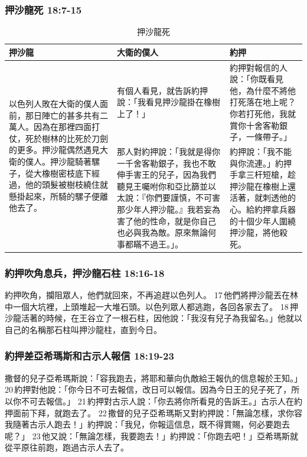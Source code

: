 \subsubsection{押沙龍死 18:7-15}
\begin{table}[H]
\hspace*{-12mm}
\centering 
\begin{tabular}{p{4.25cm}|p{6.74cm}|p{6.25cm}}\hline\hline
押沙龍&大衛的僕人&約押\\\hline
\multirow{2}{4.35cm}{以色列人敗在大衛的僕人面前，那日陣亡的甚多共有二萬人。因為在那裡四面打仗，死於樹林的比死於刀劍的更多。押沙龍偶然遇見大衛的僕人。押沙龍騎著騾子，從大橡樹密枝底下經過，他的頭髮被樹枝繞住就懸掛起來，所騎的騾子便離他去了。}
&有個人看見，就告訴約押說：「我看見押沙龍掛在橡樹上了！」
&約押對報信的人說：「你既看見他，為什麼不將他打死落在地上呢？你若打死他，我就賞你十舍客勒銀子，一條帶子。」 \\\cline{2-3}
&那人對約押說：「我就是得你一千舍客勒銀子，我也不敢伸手害王的兒子，因為我們聽見王囑咐你和亞比篩並以太說：『你們要謹慎，不可害那少年人押沙龍。』我若妄為害了他的性命，就是你自己也必與我為敵。原來無論何事都瞞不過王。」。
&約押說：「我不能與你流連。」約押手拿三杆短槍，趁押沙龍在橡樹上還活著，就刺透他的心。給約押拿兵器的十個少年人圍繞押沙龍，將他殺死。\\\hline
\end{tabular}
\caption{押沙龍死}
\end{table}

\subsubsection{約押吹角息兵，押沙龍石柱 18:16-18}
約押吹角，攔阻眾人，他們就回來，不再追趕以色列人。 17 他們將押沙龍丟在林中一個大坑裡，上頭堆起一大堆石頭。以色列眾人都逃跑，各回各家去了。 18 押沙龍活著的時候，在王谷立了一根石柱，因他說：「我沒有兒子為我留名。」他就以自己的名稱那石柱叫押沙龍柱，直到今日。

\subsubsection{約押差亞希瑪斯和古示人報信 18:19-23}
撒督的兒子亞希瑪斯說：「容我跑去，將耶和華向仇敵給王報仇的信息報於王知。」 20 約押對他說：「你今日不可去報信，改日可以報信。因為今日王的兒子死了，所以你不可去報信。」 21 約押對古示人說：「你去將你所看見的告訴王。」古示人在約押面前下拜，就跑去了。 22 撒督的兒子亞希瑪斯又對約押說：「無論怎樣，求你容我隨著古示人跑去！」約押說：「我兒，你報這信息，既不得賞賜，何必要跑去呢？」 23 他又說：「無論怎樣，我要跑去！」約押說：「你跑去吧！」亞希瑪斯就從平原往前跑，跑過古示人去了。

